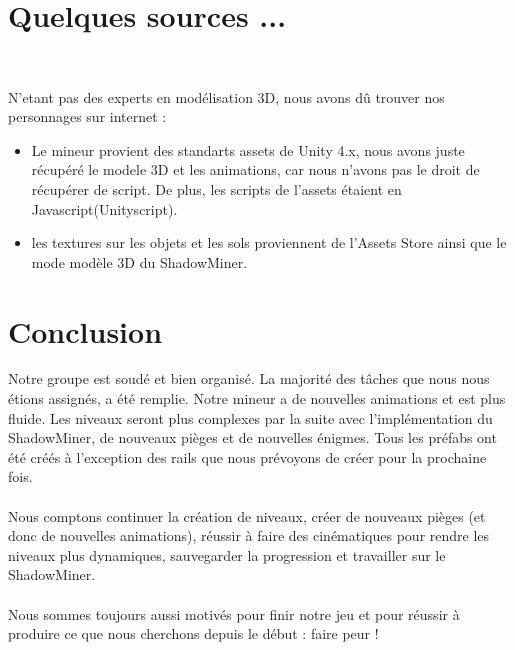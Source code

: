\documentclass[titlepage, 13px, a4paper]{report}
\begin{document}
\newpage
{}
\part{Quelques sources ...}
\paragraph{} \hspace{0pt} \\ 
N'etant pas des experts en modélisation 3D, nous avons dû trouver nos personnages sur internet : 
{\begin{itemize}
	\item Le mineur provient des standarts assets de Unity 4.x, nous avons juste récupéré le modele 3D et les animations, 
	car nous n'avons pas le droit de récupérer de script. De plus, les scripts de l'assets étaient en Javascript(Unityscript).
	\item les textures sur les objets et les sols proviennent de l'Assets Store ainsi que le mode modèle 3D du ShadowMiner.
\end{itemize}}






\newpage
{}
\part{Conclusion}
Notre groupe est soudé et bien organisé. La majorité des tâches que nous nous étions assignés, a été remplie. 
Notre mineur a de nouvelles animations et est plus fluide. Les niveaux seront plus complexes par la suite avec l’implémentation du ShadowMiner, 
de nouveaux pièges et de nouvelles énigmes. Tous les préfabs ont été créés à l’exception des rails que nous prévoyons de créer pour la prochaine fois.  \\ \\

Nous comptons continuer la création de niveaux, créer de nouveaux pièges (et donc de nouvelles animations), réussir à faire des cinématiques 
pour rendre les niveaux plus dynamiques, sauvegarder la progression et travailler sur le ShadowMiner. \\ \\

Nous sommes toujours aussi motivés pour finir notre jeu et pour réussir à produire ce que nous cherchons depuis le début : faire peur ! \\ 
\end{document}
